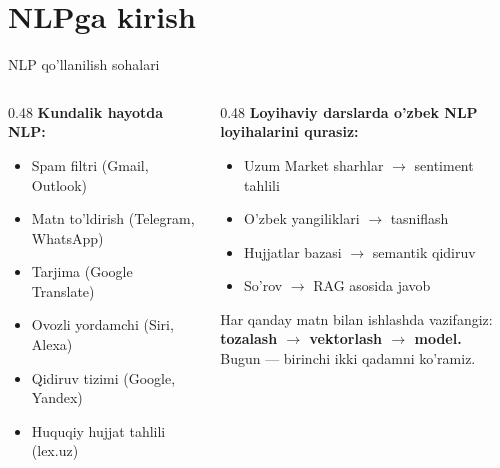 \documentclass[aspectratio=169,11pt]{beamer}
\begin{document}
\section[NLPga kirish]{NLPga kirish}

\begin{frame}{NLP qo'llanilish sohalari}
  \begin{columns}[T]
    \begin{column}{0.48\textwidth}
      \textbf{Kundalik hayotda NLP:}\\[4pt]
      \small
      \begin{itemize}\setlength\itemsep{4pt}
        \item Spam filtri (Gmail, Outlook)
        \item Matn to'ldirish (Telegram, WhatsApp)
        \item Tarjima (Google Translate)
        \item Ovozli yordamchi (Siri, Alexa)
        \item Qidiruv tizimi (Google, Yandex)
        \item Huquqiy hujjat tahlili (lex.uz)
      \end{itemize}
    \end{column}
    \begin{column}{0.48\textwidth}
      \textbf{Loyihaviy darslarda o'zbek NLP loyihalarini qurasiz:}\\[4pt]
      \small
      \begin{itemize}\setlength\itemsep{4pt}
        \item Uzum Market sharhlar $\to$ sentiment tahlili
        \item O'zbek yangiliklari $\to$ tasniflash
        \item Hujjatlar bazasi $\to$ semantik qidiruv
        \item So'rov $\to$ RAG asosida javob
      \end{itemize}
      \vspace{6pt}
      \begin{tcolorbox}[defbox,title=Umumiy qonun]
        \footnotesize
        Har qanday matn bilan ishlashda vazifangiz:\\
        \textbf{tozalash $\to$ vektorlash $\to$ model.}\\
        Bugun --- birinchi ikki qadamni ko'ramiz.
      \end{tcolorbox}
    \end{column}
  \end{columns}
\end{frame}
\end{document}
